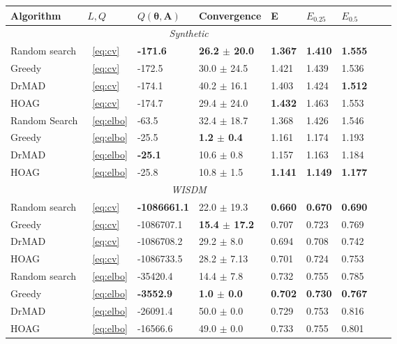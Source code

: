 \begin{table}
\small
\begin{tabularx}{\textwidth}{ |X|X|X|X|X|X|X|X|X|}

\hline
\textbf{Algorithm} & $L, Q$  & $Q(\boldsymbol{\theta}, \mathbf{A})$ & Convergence & E & $E_{0.25}$ & $E_{0.5}$\\ 
\hline
\multicolumn{7}{|c|}{\textit{Synthetic}}  \\
\hline
Random search & ~\eqref{eq:cv} & \bf -171.6  &\bf 26.2 $\pm$ 20.0  & \bf 1.367 &\bf 1.410 &\bf 1.555 \\
\hline
Greedy & ~\eqref{eq:cv} & -172.5 & 30.0 $\pm$ 24.5 & 1.421 & 1.439 &  1.536\\
\hline
DrMAD & ~\eqref{eq:cv} & -174.1 & 40.2 $\pm$ 16.1 &  1.403 & 1.424 & \bf 1.512 \\
\hline
HOAG & ~\eqref{eq:cv} &-174.7 & 29.4 $\pm$ 24.0 &   \bf 1.432  & 1.463 & 1.553\\
\hline
Random Search & ~\eqref{eq:elbo} & -63.5  & 32.4 $\pm$ 18.7  & 1.368 & 1.426 & 1.546  \\
\hline
Greedy & ~\eqref{eq:elbo} & -25.5 & \bf 1.2 $\pm$ 0.4 & 1.161 & 1.174 & 1.193\\
\hline
DrMAD & ~\eqref{eq:elbo} & \bf -25.1 &  10.6 $\pm$ 0.8 &  1.157 & 1.163 &  1.184\\
\hline
HOAG & ~\eqref{eq:elbo} &-25.8 & 10.8 $\pm$ 1.5&   \bf 1.141  & \bf 1.149 & \bf 1.177\\
\hline


\multicolumn{7}{|c|}{\textit{WISDM}}  \\
\hline
Random search & ~\eqref{eq:cv} & \bf -1086661.1  & 22.0 $\pm$ 19.3  & \bf 0.660 & \bf 0.670 & \bf 0.690  \\
\hline
Greedy & ~\eqref{eq:cv} & -1086707.1 & \bf 15.4 $\pm$ 17.2 & 0.707 &  0.723  &  0.769\\
\hline
DrMAD & ~\eqref{eq:cv} & -1086708.2 & 29.2 $\pm$ 8.0 &  0.694 &  0.708 & 0.742 \\
\hline
HOAG & ~\eqref{eq:cv} & -1086733.5 & 28.2 $\pm$ 7.13&   0.701 & 0.724 & 0.753 \\
\hline
Random search & ~\eqref{eq:elbo} & -35420.4 &   14.4 $\pm$ 7.8  &   0.732 &   0.755 & 0.785 \\
\hline
Greedy & ~\eqref{eq:elbo} & \bf -3552.9 &\bf 1.0 $\pm$ 0.0  &   \bf 0.702 & \bf 0.730  &  \bf 0.767\\
\hline
DrMAD & ~\eqref{eq:elbo} & -26091.4 &   50.0 $\pm$ 0.0  & 0.729 &  0.753 & 0.816 \\
\hline
HOAG & ~\eqref{eq:elbo} &  -16566.6 & 49.0 $\pm$ 0.0  &  0.733 &  0.755 &  0.801 \\
\hline




\end{tabularx}
\end{table}
